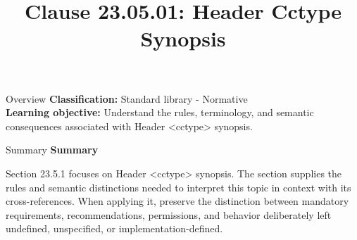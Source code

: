 \documentclass[10pt,letterpaper]{article}
\title{Clause 23.05.01: Header Cctype Synopsis}
\author{}
\date{}
\begin{document}
\maketitle
\begin{CornellOverviewBox}{Overview}
\textbf{Classification:} Standard library - Normative\\[2pt]
\textbf{Learning objective:} Understand the rules, terminology, and semantic consequences associated with Header <cctype> synopsis.
\end{CornellOverviewBox}\begin{CornellSummaryBox}{Summary}
{\sffamily\bfseries\color{Accent} Summary}\par\vspace{3pt}Section 23.5.1 focuses on Header <cctype> synopsis. The section supplies the rules and semantic distinctions needed to interpret this topic in context with its cross-references. When applying it, preserve the distinction between mandatory requirements, recommendations, permissions, and behavior deliberately left undefined, unspecified, or implementation-defined.
\end{CornellSummaryBox}
\end{document}
